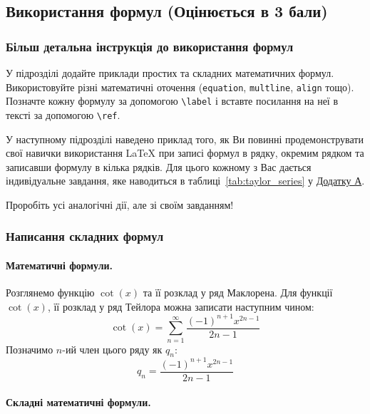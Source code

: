 \documentclass[14pt,a4paper,twoside]{article}
\begin{document}
	\subsection{Використання формул (Оцінюється в 3 бали)}
	
	
	\subsubsection{Більш детальна інструкція до використання формул}
	
	У підрозділі додайте приклади простих та складних математичних формул. Використовуйте різні математичні оточення (\texttt{equation}, \texttt{multline}, \texttt{align} тощо). Позначте кожну формулу за допомогою \texttt{\textbackslash label} і вставте посилання на неї в тексті за допомогою \texttt{\textbackslash ref}.
	
	У наступному підрозділі наведено приклад того, як Ви повинні продемонструвати свої навички використання LaTeX при записі формул в рядку, окремим рядком та записавши формулу в кілька рядків. Для цього кожному з Вас дається індивідуальне завдання, яке наводиться в таблиці~\ref{tab:taylor_series} у  \hyperref[sec:appendix1]{Додатку А}.
	
	Проробіть усі аналогічні дії, але зі своїм завданням!
	
	\subsubsection{Написання складних формул}
	
	\paragraph{Математичні формули.}
	
	Розглянемо функцію  \( \cot(x)\) та її розклад у ряд Маклорена. Для функції \( \cot(x)\), її розклад у ряд Тейлора можна записати наступним чином:
	\begin{equation} \label{eq:cot_general}
		 \cot(x) = \sum_{n=1}^{\infty} \frac{(-1)^{n+1} x^{2n-1}}{2n-1} 
	\end{equation}
	Позначимо \( n \)-ий член цього ряду як \( q_n \):
	\begin{equation} \label{eq:q_sum_n}
		q_n = \frac{(-1)^{n+1} x^{2n-1}}{2n-1}
	\end{equation}
	
	\paragraph{Складні математичні формули.}
	
\end{document}
